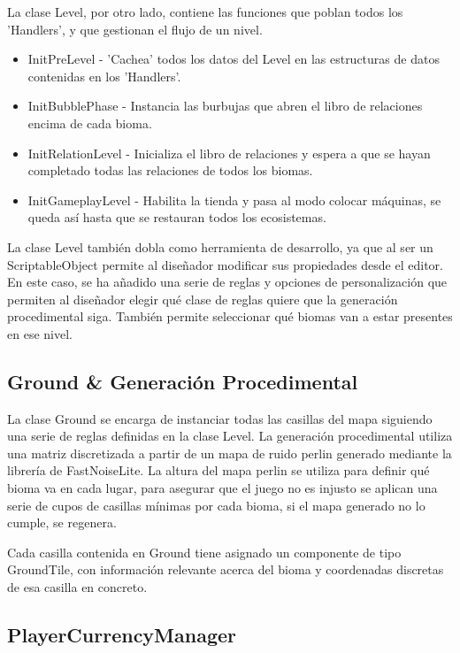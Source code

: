 La clase Level, por otro lado, contiene las funciones que poblan todos los 'Handlers', y que gestionan el flujo de un nivel.
\begin{itemize}
    \item InitPreLevel - 'Cachea' todos los datos del Level en las estructuras de datos contenidas en los 'Handlers'.
    \item InitBubblePhase - Instancia las burbujas que abren el libro de relaciones encima de cada bioma.
    \item InitRelationLevel - Inicializa el libro de relaciones y espera a que se hayan completado todas las relaciones de todos los biomas.
    \item InitGameplayLevel - Habilita la tienda y pasa al modo colocar máquinas, se queda así hasta que se restauran todos los ecosistemas.
\end{itemize}

La clase Level también dobla como herramienta de desarrollo, ya que al ser un ScriptableObject permite al diseñador modificar sus propiedades desde el editor. En este caso, se ha añadido una serie de reglas y opciones de personalización que permiten al diseñador elegir qué clase de reglas quiere que la generación procedimental siga. También permite seleccionar qué biomas van a estar presentes en ese nivel. 

\subsection{Ground \& Generación Procedimental}

La clase Ground se encarga de instanciar todas las casillas del mapa siguiendo una serie de reglas definidas en la clase Level. La generación procedimental utiliza una matriz discretizada a partir de un mapa de ruido perlin generado mediante la librería de FastNoiseLite\cite{FastNoiseLite}. La altura del mapa perlin se utiliza para definir qué bioma va en cada lugar, para asegurar que el juego no es injusto se aplican una serie de cupos de casillas mínimas por cada bioma, si el mapa generado no lo cumple, se regenera.

Cada casilla contenida en Ground tiene asignado un componente de tipo GroundTile, con información relevante acerca del bioma y coordenadas discretas de esa casilla en concreto. 

\subsection{PlayerCurrencyManager}

